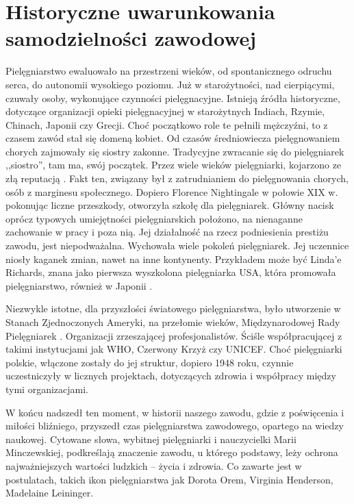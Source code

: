 \documentclass[a4paper,12pt,twoside,openany]{report}
\begin{document}
\section{Historyczne uwarunkowania samodzielności zawodowej}
Pielęgniarstwo ewaluowało na przestrzeni wieków, od spontanicznego odruchu serca, do autonomii wysokiego poziomu. Już w starożytności, nad cierpiącymi, czuwały osoby, wykonujące czynności pielęgnacyjne. Istnieją źródła historyczne, dotyczące organizacji opieki pielęgnacyjnej w starożytnych Indiach, Rzymie, Chinach, Japonii czy Grecji. Choć początkowo role te pełnili mężczyźni, to z czasem zawód stał się domeną kobiet.\cite{zro} Od czasów średniowiecza pielęgnowaniem chorych zajmowały się siostry zakonne. Tradycyjne zwracanie się do pielęgniarek ,,siostro”, tam ma, swój początek. Przez wiele wieków pielęgniarki, kojarzono ze złą reputacją \cite{tlo}. Fakt ten, związany był z zatrudnianiem do pielęgnowania chorych, osób z marginesu społecznego. Dopiero Florence Nightingale w połowie XIX w. pokonując liczne przeszkody, otworzyła szkołę dla pielęgniarek. Główny nacisk oprócz typowych umiejętności pielęgniarskich położono, na nienaganne zachowanie w pracy i poza nią. Jej działalność na rzecz podniesienia prestiżu zawodu, jest niepodważalna. \cite{flo} Wychowała wiele pokoleń pielęgniarek. Jej uczennice niosły kaganek zmian, nawet na inne kontynenty. Przykładem może być Linda'e Richards, znana jako pierwsza wyszkolona pielęgniarka USA, która promowała pielęgniarstwo, również w Japonii \cite{linda}.

Niezwykle istotne, dla przyszłości światowego pielęgniarstwa, było utworzenie w Stanach Zjednoczonych Ameryki, na przełomie wieków, Międzynarodowej Rady Pielęgniarek \cite{rada}. Organizacji zrzeszającej profesjonalistów. Ściśle współpracującej z takimi instytucjami jak WHO, Czerwony Krzyż czy UNICEF. Choć pielęgniarki polskie, włączone zostały do jej struktur, dopiero 1948 roku, czynnie uczestniczyły w licznych projektach, dotyczących zdrowia i współpracy między tymi organizacjami.

W końcu nadszedł ten moment, w historii naszego zawodu, gdzie z poświęcenia i miłości bliźniego, przyszedł czas pielęgniarstwa zawodowego, opartego na wiedzy naukowej. Cytowane słowa, wybitnej pielęgniarki i nauczycielki Marii Minczewskiej, podkreślają znaczenie zawodu, u którego podstawy, leży  ochrona najważniejszych wartości ludzkich – życia i zdrowia.  Co zawarte jest w postulatach, takich ikon pielęgniarstwa jak Dorota Orem, Virginia Henderson, Madelaine Leininger.\cite{ikon}
\end{document}
